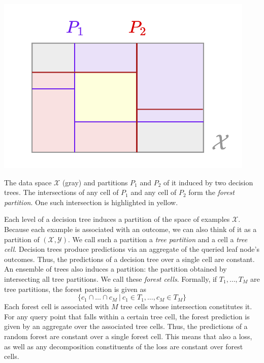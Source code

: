 \documentclass[../main.tex]{subfiles}
\begin{document}
\begin{marginfigure}
    \includegraphics[width=\textwidth]{figma-illustrations/forest-partition.pdf}
    \label{fig:forest-partition}
    \caption{The  data space $\mathcal{X}$ (gray) and partitions  $P_1$ and  $P_2$  of it induced by two decision trees. The  intersections of any cell of $P_1$ and any cell of $P_2$ form the \textit{forest partition}. One such intersection is highlighted in yellow.
    }
\end{marginfigure}
Each level of a decision tree induces a partition of the space of examples $\mathcal{X}$. Because each example is associated with an outcome, we can also think of it as a partition of $(\mathcal{X}, \mathcal{Y})$. We call such a partition a \textit{tree partition} and a cell a \textit{tree cell}.
Decision trees produce predictions via an aggregate of the queried leaf node's outcomes. Thus, the predictions of a decision tree over a single cell are constant.
An ensemble of trees also induces a partition: the partition obtained by intersecting all tree partitions. We call these \textit{forest cells}. Formally, if $T_{1}, \dots, T_{M}$ are tree partitions, the forest partition is given as
$$
\{ c_{1} \cap \dots \cap c_{M} ~|~ c_{1} \in T_{1}, \dots, c_{M} \in T_{M}\}
$$
Each forest cell is associated with $M$ tree cells whose intersection constitutes it.
For any query point that falls within a certain tree cell, the forest prediction is given by an aggregate over the associated tree cells. Thus, the predictions of a random forest are constant over a single forest cell.
This means that also a loss, as well as any decomposition constituents of the loss are constant over forest cells.
\end{document}

